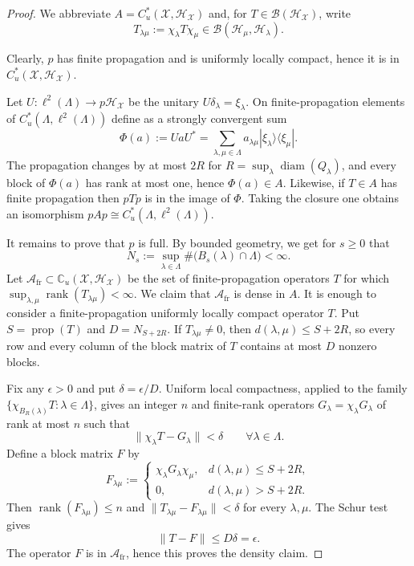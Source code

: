 \documentclass[10pt,a4paper]{amsart}
\newcommand{\Bb}{{\mathcal B}}
\newcommand{\CM}{{\mathbb C}}
\newcommand{\Hh}{{\mathcal H}}
\newcommand{\Xx}{{\mathcal X}}
\DeclareMathOperator{\diam}{diam}
\begin{document}
\begin{proof}
We abbreviate $A=C_u^*(\Xx,\Hh_\Xx)$ and, for $T\in\Bb(\Hh_\Xx)$, write
\[T_{\lambda\mu}:=\chi_\lambda T\chi_\mu
 \in\Bb(\Hh_\mu,\Hh_\lambda).\]

Clearly, $p$ has finite propagation and is uniformly locally compact, hence it is in $C^*_u(\Xx,\Hh_\Xx)$.

Let $U:\ell^2(\Lambda)\to p\Hh_\Xx$ be the unitary
$U\delta_\lambda=\xi_\lambda$.  On finite-propagation elements of $C^*_u(\Lambda,\ell^2(\Lambda))$ define as a strongly convergent sum
\[\Phi(a):=UaU^* =\sum_{\lambda,\mu\in\Lambda} a_{\lambda\mu}|\xi_\lambda\rangle\langle\xi_\mu|.\]
The propagation changes by at most $2R$ for $R=\sup_{\lambda}\diam(Q_\lambda)$, and every block of $\Phi(a)$ has rank
at most one, hence $\Phi(a)\in A$. Likewise, if $T\in A$ has finite propagation then $pTp$ is in the image of $\Phi$. Taking the closure one obtains an isomorphism $pAp\cong C_u^*(\Lambda,\ell^2(\Lambda)).$

It remains to prove that $p$ is full. 
By bounded geometry, we get for $s\geq0$ that
\[N_s:=\sup_{\lambda\in\Lambda} \#\bigl(B_s(\lambda)\cap\Lambda\bigr)<\infty.\]
 Let $\mathcal A_{\mathrm{fr}}\subset \CM_u(\Xx, \Hh_\Xx)$ be the set of finite-propagation operators $T$ for which $\sup_{\lambda,\mu}\operatorname{rank}(T_{\lambda\mu})<\infty$. 
We claim that $\mathcal A_{\mathrm{fr}}$ is dense in $A$.  It is enough to
consider a finite-propagation uniformly locally compact operator $T$.  Put
$S=\operatorname{prop}(T)$ and $D=N_{S+2R}$.  If $T_{\lambda\mu}\neq0$, then
$d(\lambda,\mu)\leq S+2R$, so every row and every column of the block matrix of
$T$ contains at most $D$ nonzero blocks.

Fix any $\epsilon>0$ and put $\delta=\epsilon/D$. Uniform local compactness, applied to the family
$\{\chi_{B_R(\lambda)}T:\lambda\in\Lambda\}$, gives an integer $n$ and
finite-rank operators $G_\lambda=\chi_\lambda G_\lambda$ of rank at most $n$ such that
\[\|\chi_{\lambda}T-G_\lambda\|<\delta
 \qquad \forall\lambda\in\Lambda.\]
Define a block matrix $F$ by
\[F_{\lambda\mu}:=
 \begin{cases}
  \chi_\lambda G_\lambda\chi_\mu,
     &d(\lambda,\mu)\leq S+2R,\\
  0,&d(\lambda,\mu)>S+2R.
 \end{cases}\]
Then $\operatorname{rank}(F_{\lambda\mu})\leq n$ and
$\|T_{\lambda\mu}-F_{\lambda\mu}\|<\delta$ for every $\lambda,\mu$.
The Schur test gives
\[\|T-F\|\leq D\delta=\epsilon.\]
The operator $F$ is in $\mathcal A_{\mathrm{fr}}$, hence this proves the density claim.


\end{proof}
\end{document}
